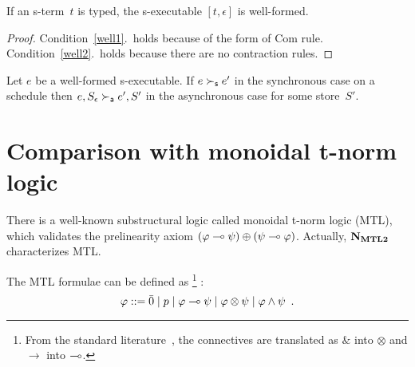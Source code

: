 \begin{proposition}
 If an s-term~$t$ is typed, the s-executable $[t,\epsilon]$ is well-formed.
\end{proposition}
\begin{proof}
 Condition~\ref{well1}.~holds because of the form of Com rule.
 Condition~\ref{well2}.~holds
 because there are no contraction rules.
\end{proof}

\begin{proposition}
 Let $e$ be a well-formed s-executable.
 If $e\succ_{\mathsf s} e'$ in the synchronous case on a schedule then $e, S_\epsilon \succ_{\mathsf a} e', S'$
 in the asynchronous case for some store~$S'$.
\end{proposition}

\section{Comparison with monoidal t-norm logic}

There is a well-known substructural logic called monoidal t-norm logic
(MTL), which validates the prelinearity axiom
$(\varphi\multimap\psi)\oplus(\psi\multimap\varphi)$.  Actually, $\mathbf{N}_{\mathbf{MTL2}}$ characterizes
MTL.

The MTL formulae can be defined as%
\footnote{From the standard literature~\citep{handbook:fuzzy}, the connectives
are translated as $\&$ into $\otimes$ and $\rightarrow$ into $\multimap$.}%
:
\[
 \varphi::= \bar{0}\mid p\mid \varphi\multimap\psi \mid \varphi\otimes \psi \mid \varphi \land \psi\enspace.
\]

